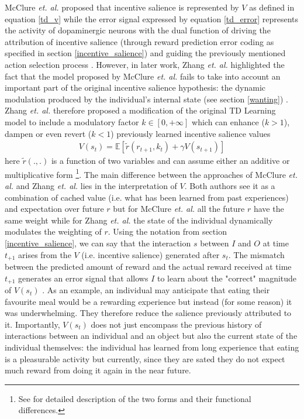 
McClure \textit{et. al.} proposed that incentive salience is represented by $V$ as defined in equation \ref{td_v} while the error signal expressed by equation \ref{td_error} represents the activity of dopaminergic neurons with the dual function of driving the attribution of incentive salience (through reward prediction error coding as specified in section \ref{incentive_salience}) and guiding the previously mentioned action selection process \cite{schultz1997neural,mcclure2003computational,o2003temporal}. However, in later work, Zhang \textit{et. al.} highlighted the fact that the model proposed by McClure \textit{et. al.} fails to take into account an important part of the original incentive salience hypothesis: the dynamic modulation produced by the individual's internal state (see section \ref{wanting}) \cite{toates1994comparing,mcclure2003computational,berridge2004motivation,zhang2009neural,tindell2009dynamic,berridge2012prediction}. Zhang \textit{et. al.} therefore proposed a modification of the original TD Learning model to include a modulatory factor $k \in [0, +\infty]$ which can enhance ($k > 1$), dampen or even revert ($k < 1$) previously learned incentive salience values
\begin{align}
    \label{zhang_td_v}
    V(s_t) = \mathbb{E}[\tilde{r}(r_{t+1},k_{t}) + \gamma V(s_{t+1})]
\end{align}
here $\tilde{r}(.,.)$ is a function of two variables and can assume either an additive or multiplicative form \footnote{See \cite{zhang2009neural} for detailed description of the two forms and their functional differences.}. The main difference between the approaches of McClure \textit{et. al.} and Zhang \textit{et. al.} lies in the interpretation of $V$. Both authors see it as a combination of cached value (i.e. what has been learned from past experiences) and expectation over future $r$ but for McClure \textit{et. al.} all the future $r$ have the same weight while for Zhang \textit{et. al.} the state of the individual dynamically modulates the weighting of $r$. Using the notation from section \ref{incentive_salience}, we can say that the interaction $s$ between $I$ and $O$ at time $t_{+1}$ arises from the $V$ (i.e. incentive salience) generated after $s_{t}$. The mismatch between the predicted amount of reward and the actual reward received at time $t_{+1}$ generates an error signal that allows $I$ to learn about the "correct" magnitude of $V(s_{t})$ \cite{schultz2017reward} . As an example, an individual may anticipate that eating their favourite meal would be a rewarding experience but instead (for some reason) it was underwhelming. They therefore reduce the salience previously attributed to it. Importantly, $V(s_{t})$ does not just encompass the previous history of interactions between an individual and an object but also the current state of the individual themselves: the individual has learned from long experience that eating is a pleasurable activity but currently, since they are sated they do not expect much reward from doing it again in the near future. 

